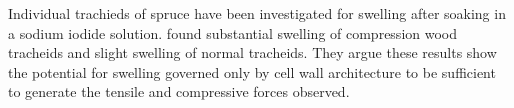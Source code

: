 Individual trachieds of spruce have been investigated for swelling after soaking in a sodium iodide solution. \cite{Burgert_2007} found substantial swelling of compression wood tracheids and slight swelling of normal tracheids. They argue these results show the potential for swelling governed only by cell wall architecture to be sufficient to generate the tensile and compressive forces observed.